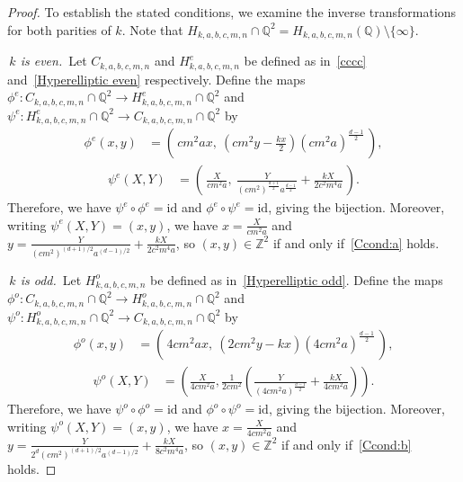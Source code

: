 \documentclass[11pt,a4paper]{amsart}
\newcommand{\ZZ}{\mathbb{Z}}
\newcommand{\Q}{\mathbb{Q}}
\theoremstyle{plain}
\theoremstyle{definition}
\begin{document}
\begin{proof}
To establish the stated conditions, we examine the inverse transformations for both parities of $k$. Note that $H_{k,a,b,c,m,n}\cap \Q^2=H_{k,a,b,c,m,n}(\Q)\setminus\{\infty\}$.

 \,\textit{$k$ is even.}\,
Let $C_{k,a,b,c,m,n}$ and $H^{e}_{k,a,b,c,m,n}$ be defined as in~\eqref{cccc} and~\eqref{Hyperelliptic even} respectively. Define the maps  $ \phi^e \colon C_{k,a,b,c,m,n}\cap \Q^2 \rightarrow H^e_{k,a,b,c,m,n}\cap \Q^2$ and $  \psi^e \colon H^e_{k,a,b,c,m,n} \cap \Q^2\rightarrow C_{k,a,b,c,m,n}\cap \Q^2$ by
\begin{align}
  \phi^e(x,y)
    &= \left(\,cm^2ax,\ \left(cm^2y - \frac{kx}{2}\right)(cm^2a)^{\frac{d-1}{2}}\,\right),
      \label{even forward}
\end{align}
\begin{align}
  \psi^e(X,Y)
    &= \left(\,\frac{X}{cm^2a},\
        \frac{Y}{(cm^2)^{\frac{d+1}{2}}a^{\frac{d-1}{2}}}
        + \frac{kX}{2c^2m^4a}\,\right).
      \label{even invert}
\end{align}
Therefore, we have $\psi^e\circ\phi^e=\mathrm{id}$ and $\phi^e\circ\psi^e=\mathrm{id}$, giving the bijection. Moreover, writing $\psi^e(X,Y)=(x,y)$, we have $x=\frac{X}{cm^2a}$ and $y=\frac{Y}{(cm^2)^{(d+1)/2}a^{(d-1)/2}}+\frac{kX}{2c^2m^4a}$, so $(x,y)\in\ZZ^2$ if and only if~\ref{Ccond:a} holds.

 \,\textit{$k$ is odd.}\,
Let $H^{o}_{k,a,b,c,m,n}$ be defined as in~\eqref{Hyperelliptic odd}. Define the maps  $ \phi^{o} \colon C_{k,a,b,c,m,n}\cap \Q^2 \rightarrow H^{o}_{k,a,b,c,m,n}\cap \Q^2$ and $  \psi^{o} \colon H^{o}_{k,a,b,c,m,n} \cap \Q^2\rightarrow C_{k,a,b,c,m,n}\cap \Q^2$ by
\begin{align}
  \phi^{o}(x,y)
    &= \left(\,4cm^2ax,\ \left(2cm^2y -kx\right)(4cm^2a)^{\frac{d-1}{2}}\,\right),
      \label{odd forward}
\end{align}
\begin{align}
  \psi^{o}(X,Y)
    &= \left(   \frac{X}{4cm^2a},\frac{1}{2cm^2}\left(\frac{Y}{(4cm^2a)^{\frac{d-1}{2}}} +\frac{kX}{4cm^2a}\right)  \right).
      \label{odd invert}
\end{align} 
Therefore, we have $\psi^o\circ\phi^o=\mathrm{id}$ and $\phi^o\circ\psi^o=\mathrm{id}$, giving the bijection. Moreover, writing $\psi^o(X,Y)=(x,y)$, we have $x=\frac{X}{4cm^2a}$ and $y=\frac{Y}{2^d(cm^2)^{(d+1)/2}a^{(d-1)/2}}+\frac{kX}{8c^2m^4a}$, so $(x,y)\in\ZZ^2$ if and only if~\ref{Ccond:b} holds.
\end{proof}
\end{document}
